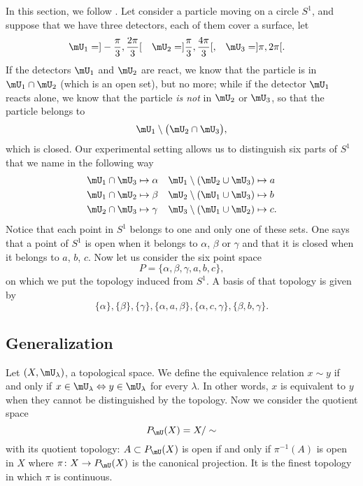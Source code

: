 In this section, we follow \cite{Landi}. Let consider a particle moving on a circle $S^1$, and suppose that we have three detectors, each of them cover a surface, let 
\begin{align*}
\mU_1&=]-\frac{ \pi }{ 3 },\frac{ 2\pi }{ 3 }[&\mU_2&=]\frac{ \pi }{ 3 },\frac{ 4\pi }{ 3 }[,&\mU_3&=]\pi,2\pi[.
\end{align*}
If the detectors $\mU_1$ and $\mU_2$ are react, we know that the particle is in $\mU_1\cap\mU_2$ (which is an open set), but no more; while if the detector $\mU_1$ reacts alone, we know that the particle \emph{is not} in $\mU_2$ or $\mU_3$, so that the particle belongs to 
\[ 
  \mU_1\setminus\big( \mU_2\cap\mU_3 \big),
\]
which is closed. Our experimental setting allows us to distinguish six parts of $S^1$ that we name in the following way
\begin{align*}
\mU_1\cap\mU_3&\mapsto \alpha		&\mU_1\setminus (\mU_2\cup\mU_3)&\mapsto a\\
\mU_1\cap\mU_2&\mapsto \beta		&\mU_2\setminus (\mU_1\cup\mU_3)&\mapsto b\\
\mU_2\cap\mU_3&\mapsto \gamma		&\mU_3\setminus (\mU_1\cup\mU_2)&\mapsto c.
\end{align*}
Notice that each point in $S^1$ belongs to one and only one of these sets. One says that a point of $S^1$ is open when it belongs to $\alpha$, $\beta$ or $\gamma$ and that it is closed when it belongs to $a$, $b$, $c$. Now let us consider the six point space
\[ 
  P=\{ \alpha,\beta,\gamma,a,b,c \},
\]
on which we put the topology induced from $S^1$. A basis of that topology is given by
\[ 
  \{ \alpha \},\{ \beta \},\{ \gamma \},\{ \alpha,a,\beta \},\{ \alpha,c,\gamma \},\{ \beta,b,\gamma \}.
\]

\subsection{Generalization}

Let $(X,\mU_{\lambda})$, a topological space. We define the equivalence relation $x\sim y$ if and only if $x\in\mU_{\lambda}\Leftrightarrow y\in\mU_{\lambda}$ for every $\lambda$. In other words, $x$ is equivalent to $y$ when they cannot be distinguished by the topology. Now we consider the quotient space
\[ 
  P_{\mU}(X)=X/\sim
\]
with its quotient topology: $A\subset P_{\mU}(X)$ is open if and only if $\pi^{-1}(A)$ is open in $X$ where $\pi\colon X\to P_{\mU}(X)$ is the canonical projection. It is the finest topology in which $\pi$ is continuous.

